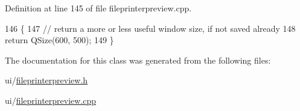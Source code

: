 Definition at line 145 of file fileprinterpreview.\+cpp.


\begin{DoxyCode}
146 \{
147     \textcolor{comment}{// return a more or less useful window size, if not saved already}
148     \textcolor{keywordflow}{return} QSize(600, 500);
149 \}
\end{DoxyCode}


The documentation for this class was generated from the following files\+:\begin{DoxyCompactItemize}
\item 
ui/\hyperlink{fileprinterpreview_8h}{fileprinterpreview.\+h}\item 
ui/\hyperlink{fileprinterpreview_8cpp}{fileprinterpreview.\+cpp}\end{DoxyCompactItemize}
